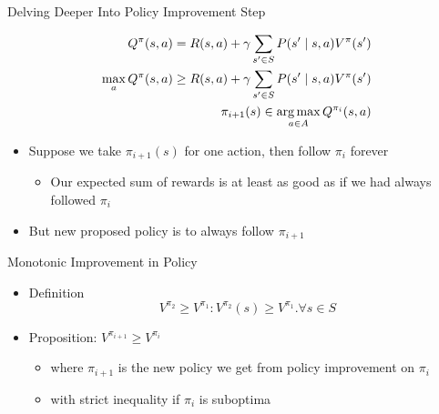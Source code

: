 \begin{frame}[c]{Delving Deeper Into Policy Improvement Step}

\begin{eqnarray}
Q^\pi(s,a) = R(s,a) + \gamma \sum_{s' \in S} P(s' \mid s,a) V^\pi(s')\nonumber\\
\max_a Q^\pi(s,a) \geq R(s,a) + \gamma \sum_{s' \in S} P(s' \mid s,a) V^\pi(s') \nonumber\\
\pi_{i+1}(s) \in \operatorname*{arg\,max}_{a\in A} Q^{\pi_i} (s,a)\nonumber
\end{eqnarray}

\begin{itemize}
	\item Suppose we take $\pi_{i+1}(s)$ for one action, then follow $\pi_i$ forever
	\begin{itemize}
		\item Our expected sum of rewards is at least as good as if we had always
		followed $\pi_i$
	\end{itemize}
	\item But new proposed policy is to always follow $\pi_{i+1}$
\end{itemize}

\end{frame}
\begin{frame}[c]{Monotonic Improvement in Policy}

\begin{itemize}
	\item  Definition
	$$ V^{\pi_2} \geq V^{\pi_1}: V^{\pi_2}(s) \geq V^{\pi_1}. \forall s \in S $$
	\item Proposition: $V^{\pi_{i+1}} \geq V^{\pi_{i}}$
	\begin{itemize}
		\item where $\pi_{i+1}$ is the new policy we get from policy improvement on $\pi_i$
		\item with strict inequality if $\pi_i$ is suboptima
	\end{itemize} 
\end{itemize}

\end{frame}
